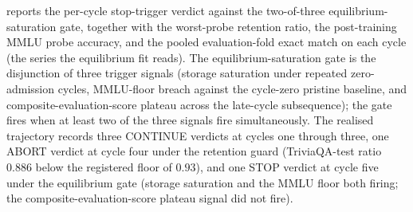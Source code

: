  reports the per-cycle stop-trigger verdict against the two-of-three equilibrium-saturation gate, together with the worst-probe retention ratio, the post-training MMLU probe accuracy, and the pooled evaluation-fold exact match on each cycle (the series the equilibrium fit reads). The equilibrium-saturation gate is the disjunction of three trigger signals (storage saturation under repeated zero-admission cycles, MMLU-floor breach against the cycle-zero pristine baseline, and composite-evaluation-score plateau across the late-cycle subsequence); the gate fires when at least two of the three signals fire simultaneously. The realised trajectory records three CONTINUE verdicts at cycles one through three, one ABORT verdict at cycle four under the retention guard (TriviaQA-test ratio $0.886$ below the registered floor of $0.93$), and one STOP verdict at cycle five under the equilibrium gate (storage saturation and the MMLU floor both firing; the composite-evaluation-score plateau signal did not fire).

